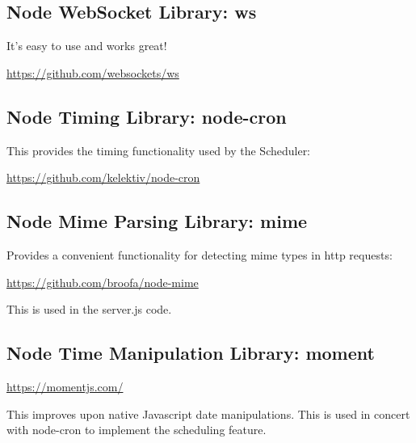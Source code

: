 \subsection{Node WebSocket Library: ws}

It's easy to use and works great!

\url{https://github.com/websockets/ws}

\subsection{Node Timing Library: node-cron}

This provides the timing functionality used by the Scheduler:

\url{https://github.com/kelektiv/node-cron}

\subsection{Node Mime Parsing Library: mime}

Provides a convenient functionality for detecting mime types in http requests:

\url{https://github.com/broofa/node-mime}

This is used in the server.js code.

\subsection{Node Time Manipulation Library: moment}

\url{https://momentjs.com/}

This improves upon native Javascript date manipulations.  This is used in 
concert with node-cron to implement the scheduling feature.